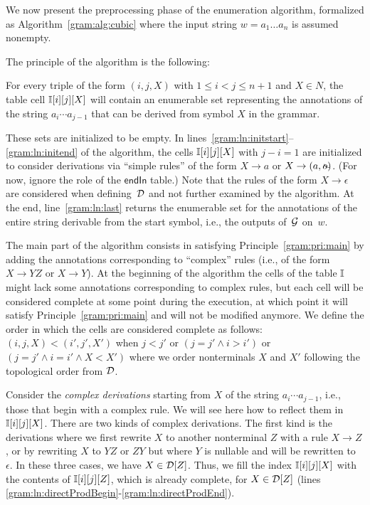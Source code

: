 We now present the preprocessing phase of the enumeration algorithm, formalized as
Algorithm~\ref{gram:alg:cubic} where the  input string $w=a_1\ldots a_n$ is
assumed nonempty. 

The principle of the algorithm is the following:
\begin{principle}
  \label{gram:pri:main}
    For every triple
of the form $(i,j,X)$ with $1\leq i < j \leq n+1$ and $X\in N$, the
table cell $\mathbb{I}[i][j][X]$ will contain an enumerable set
representing the annotations of the string $a_i \cdots a_{j-1}$ that
can be derived from symbol $X$ in the grammar.
\end{principle}
%
These sets are initialized to be empty.
In lines~\ref{gram:ln:initstart}--\ref{gram:ln:initend} of the algorithm, the cells $\mathbb{I}[i][j][X]$ with
$j-i=1$ are initialized
to consider derivations via ``simple rules'' of the form $X \rightarrow a$ or
$X \rightarrow (a, \oout)$.
(For now, ignore the role of the
$\mathsf{endIn}$ table.) Note that the rules of the form $X \rightarrow
\epsilon$ are considered when defining~$\mathcal{D}$ and not further examined by the algorithm. At the end, line~\ref{gram:ln:last} returns the
enumerable set for the annotations of the entire string derivable from
the start symbol, i.e., the outputs of~$\mathcal{G}$ on~$w$.

%
%
%
%

The main part of the algorithm consists in satisfying Principle~\ref{gram:pri:main} by adding
the annotations corresponding to ``complex'' rules (i.e., of the form
$X\rightarrow YZ$ or $X\rightarrow Y$). At the beginning of the
algorithm the cells of the table $\mathbb{I}$ might lack some annotations
corresponding to complex rules, but each cell will be considered
complete at some point during the execution, at which point it will
satisfy Principle~\ref{gram:pri:main} and will not be modified anymore.
%
We define the order in which the cells are considered complete as follows:
$(i,j,X)<(i',j',X')$ when $j<j'$ or
$(j=j' \land i>i')$ or $(j=j' \land i=i' \land X < X')$ where we order
nonterminals $X$ and $X'$ following the topological order from $\mathcal{D}$.

Consider the \emph{complex derivations} starting from $X$ of the string $a_i \cdots
a_{j-1}$, i.e., those that begin with a complex rule. We will see here how to
reflect them in $\mathbb{I}[i][j][X]$. There are two kinds of complex
derivations. The first kind is the derivations where we first rewrite $X$
to another nonterminal $Z$ with a rule $X \rightarrow Z$, or by
rewriting $X$ to $YZ$ or $ZY$ but where $Y$ is nullable and will be
rewritten to~$\epsilon$. In these three cases, we have
$X \in \mathcal{D}[Z]$. Thus, we fill the index $\mathbb{I}[i][j][X]$ with the
contents of $\mathbb{I}[i][j][Z]$, which is already complete, for
$X\in \mathcal{D}[Z]$ (lines \ref{gram:ln:directProdBegin}-\ref{gram:ln:directProdEnd}).
%
%

